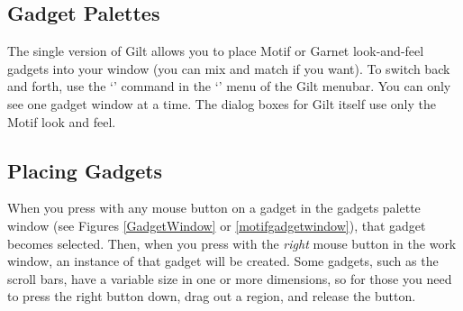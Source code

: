 \subsection{Gadget Palettes}

The single version of Gilt allows you to place Motif or Garnet look-and-feel
gadgets into your window (you can mix and match if you want).  To switch
back and forth, use the `' command in the `'
menu of the Gilt menubar.  You can only see one gadget window at a time.
The dialog boxes for Gilt itself use only the Motif look and feel.


\subsection{Placing Gadgets}

When you press with any mouse button on a gadget in the gadgets palette window
(see Figures \ref{GadgetWindow} or \ref{motifgadgetwindow}),
that gadget becomes selected.  Then, when you press with the {\it right}
mouse button in the work window, an instance of that gadget will be created.
Some gadgets, such as the scroll bars, have a variable size in one or more
dimensions, so for those you need to press the right button down, drag out
a region, and release the button.

